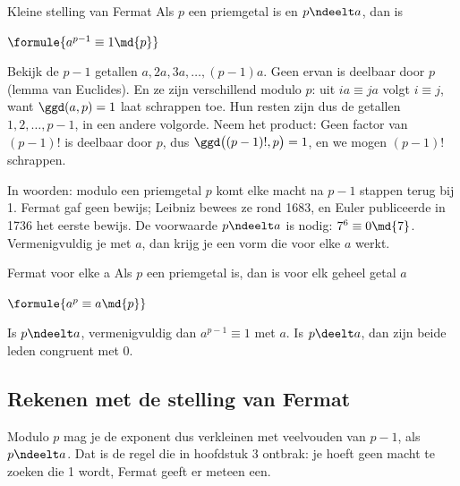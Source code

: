 \begin{theorie}
\begin{stelling}{Kleine stelling van Fermat}
Als $p$ een priemgetal is en $p \ndeelt a$, dan is

\vspace{1mm}
\qquad $\formule{a^{p - 1} \equiv 1 \md{p}}$
\end{stelling}

\begin{bewijs}
Bekijk de $p - 1$ getallen $a, 2a, 3a, \ldots, (p - 1)a$. Geen ervan is deelbaar door $p$ (lemma van Euclides). En ze zijn verschillend modulo $p$: uit $ia \equiv ja$ volgt $i \equiv j$, want $\ggd(a, p) = 1$ laat schrappen toe. Hun resten zijn dus de getallen $1, 2, \ldots, p - 1$, in een andere volgorde. Neem het product:
Geen factor van $(p - 1)!$ is deelbaar door $p$, dus $\ggd\bigl((p - 1)!, p\bigr) = 1$, en we mogen $(p - 1)!$ schrappen.
\end{bewijs}
\end{theorie}

In woorden: modulo een priemgetal $p$ komt elke macht na $p - 1$ stappen terug bij 1. Fermat gaf geen bewijs; Leibniz bewees ze rond 1683, en Euler publiceerde in 1736 het eerste bewijs. De voorwaarde $p \ndeelt a$ is nodig: $7^6 \equiv 0 \md{7}$. Vermenigvuldig je met $a$, dan krijg je een vorm die voor elke $a$ werkt.

\begin{theorie}
\begin{stelling}{Fermat voor elke a}
Als $p$ een priemgetal is, dan is voor elk geheel getal $a$

\vspace{1mm}
\qquad $\formule{a^p \equiv a \md{p}}$
\end{stelling}

\begin{bewijs}
Is $p \ndeelt a$, vermenigvuldig dan $a^{p - 1} \equiv 1$ met $a$. Is $p \deelt a$, dan zijn beide leden congruent met 0.
\end{bewijs}
\end{theorie}

\subsection{Rekenen met de stelling van Fermat}

Modulo $p$ mag je de exponent dus verkleinen met veelvouden van $p - 1$, als $p \ndeelt a$. Dat is de regel die in hoofdstuk 3 ontbrak: je hoeft geen macht te zoeken die 1 wordt, Fermat geeft er meteen een.

